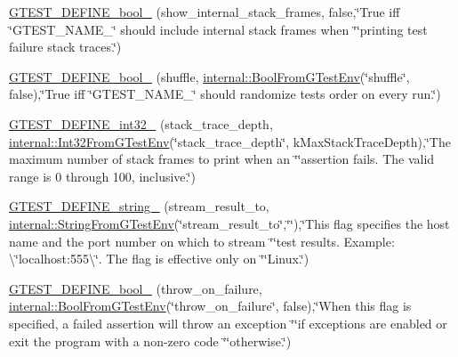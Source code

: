 \begin{DoxyCompactItemize}
\item 
\hyperlink{namespacetesting_a5982e64522de6804cbf5d1732fd62751}{G\+T\+E\+S\+T\+\_\+\+D\+E\+F\+I\+N\+E\+\_\+bool\+\_\+} (show\+\_\+internal\+\_\+stack\+\_\+frames, false,\char`\"{}True iff \char`\"{}G\+T\+E\+S\+T\+\_\+\+N\+A\+M\+E\+\_\+\char`\"{} should include internal stack frames when \char`\"{}\char`\"{}printing test failure stack traces.\char`\"{})
\item 
\hyperlink{namespacetesting_acc11444cd1c18500658a35e02d4f2cf9}{G\+T\+E\+S\+T\+\_\+\+D\+E\+F\+I\+N\+E\+\_\+bool\+\_\+} (shuffle, \hyperlink{namespacetesting_1_1internal_a67132cdce23fb71b6c38ee34ef81eb4c}{internal\+::\+Bool\+From\+G\+Test\+Env}(\char`\"{}shuffle\char`\"{}, false),\char`\"{}True iff \char`\"{}G\+T\+E\+S\+T\+\_\+\+N\+A\+M\+E\+\_\+\char`\"{} should randomize tests\textquotesingle{} order on every run.\char`\"{})
\item 
\hyperlink{namespacetesting_aaedd7015b957f3c37662c289b645e7d9}{G\+T\+E\+S\+T\+\_\+\+D\+E\+F\+I\+N\+E\+\_\+int32\+\_\+} (stack\+\_\+trace\+\_\+depth, \hyperlink{namespacetesting_1_1internal_a0f7e728793f9e6cb0aa2b69eaa468bf3}{internal\+::\+Int32\+From\+G\+Test\+Env}(\char`\"{}stack\+\_\+trace\+\_\+depth\char`\"{}, k\+Max\+Stack\+Trace\+Depth),\char`\"{}The maximum number of stack frames to print when an \char`\"{}\char`\"{}assertion fails.  The valid range is 0 through 100, inclusive.\char`\"{})
\item 
\hyperlink{namespacetesting_a0422a6f971513cf559a8575a0533b235}{G\+T\+E\+S\+T\+\_\+\+D\+E\+F\+I\+N\+E\+\_\+string\+\_\+} (stream\+\_\+result\+\_\+to, \hyperlink{namespacetesting_1_1internal_a7ed785df46a339403b0f749d3a879201}{internal\+::\+String\+From\+G\+Test\+Env}(\char`\"{}stream\+\_\+result\+\_\+to\char`\"{},\char`\"{}\char`\"{}),\char`\"{}This flag specifies the host name and the port number on which to stream \char`\"{}\char`\"{}test results. Example\+: \textbackslash{}\char`\"{}localhost\+:555\textbackslash{}\char`\"{}. The flag is effective only on \char`\"{}\char`\"{}Linux.\char`\"{})
\item 
\hyperlink{namespacetesting_a05ff4385edff6d44f6823f5eade7abe2}{G\+T\+E\+S\+T\+\_\+\+D\+E\+F\+I\+N\+E\+\_\+bool\+\_\+} (throw\+\_\+on\+\_\+failure, \hyperlink{namespacetesting_1_1internal_a67132cdce23fb71b6c38ee34ef81eb4c}{internal\+::\+Bool\+From\+G\+Test\+Env}(\char`\"{}throw\+\_\+on\+\_\+failure\char`\"{}, false),\char`\"{}When this flag is specified, a failed assertion will throw an exception \char`\"{}\char`\"{}if exceptions are enabled or exit the program with a non-\/zero code \char`\"{}\char`\"{}otherwise.\char`\"{})

\end{DoxyCompactItemize}
